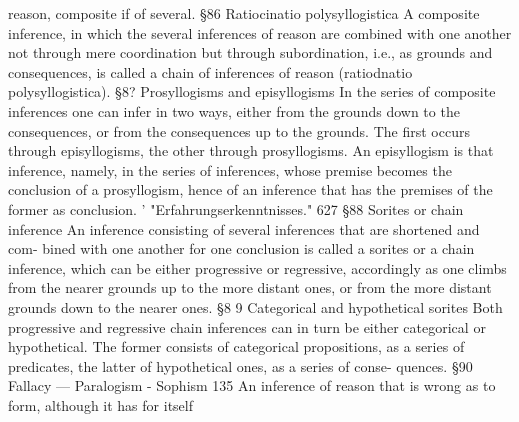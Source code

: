 reason, composite if of several.
§86
Ratiocinatio polysyllogistica
A composite inference, in which the several inferences of reason are
combined with one another not through mere coordination but through
subordination, i.e., as grounds and consequences, is called a chain of
inferences of reason (ratiodnatio polysyllogistica).
§8?
Prosyllogisms and episyllogisms
In the series of composite inferences one can infer in two ways, either
from the grounds down to the consequences, or from the consequences
up to the grounds. The first occurs through episyllogisms, the other
through prosyllogisms.
An episyllogism is that inference, namely, in the series of inferences,
whose premise becomes the conclusion of a prosyllogism, hence of an
inference that has the premises of the former as conclusion.
'
"Erfahrungserkenntnisses."
627
§88
Sorites or chain inference
An inference consisting of several inferences that are shortened and com-
bined with one another for one conclusion is called a sorites or a chain
inference, which can be either progressive or regressive, accordingly as one
climbs from the nearer grounds up to the more distant ones, or from the
more distant grounds down to the nearer ones.
§8 9
Categorical and hypothetical sorites
Both progressive and regressive chain inferences can in turn be either
categorical or hypothetical. The former consists of categorical propositions, as a
series of predicates, the latter of hypothetical ones, as a series of conse-
quences.
§90
Fallacy — Paralogism - Sophism
135
An inference of reason that is wrong as to form, although it has for itself
